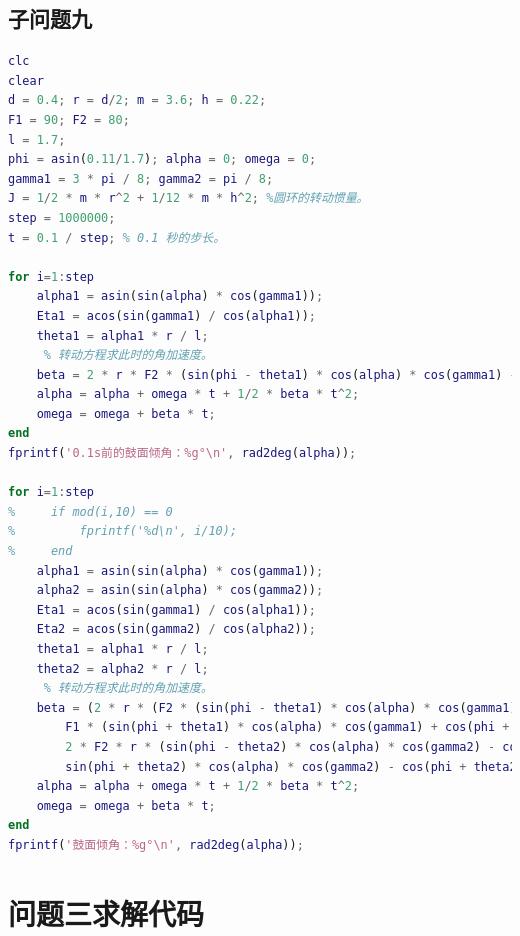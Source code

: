 \documentclass{cumcm}
\begin{document}
\subsection{子问题九}
\begin{lstlisting}[language=matlab]
clc
clear
d = 0.4; r = d/2; m = 3.6; h = 0.22;
F1 = 90; F2 = 80;
l = 1.7;
phi = asin(0.11/1.7); alpha = 0; omega = 0;
gamma1 = 3 * pi / 8; gamma2 = pi / 8;
J = 1/2 * m * r^2 + 1/12 * m * h^2; %圆环的转动惯量。
step = 1000000;
t = 0.1 / step; % 0.1 秒的步长。

for i=1:step
    alpha1 = asin(sin(alpha) * cos(gamma1));
    Eta1 = acos(sin(gamma1) / cos(alpha1));
    theta1 = alpha1 * r / l;
     % 转动方程求此时的角加速度。
    beta = 2 * r * F2 * (sin(phi - theta1) * cos(alpha) * cos(gamma1) - cos(phi - theta1) * sin(alpha1) * sin(Eta1)) / J;
    alpha = alpha + omega * t + 1/2 * beta * t^2;
    omega = omega + beta * t;
end
fprintf('0.1s前的鼓面倾角：%g°\n', rad2deg(alpha));

for i=1:step
%     if mod(i,10) == 0
%         fprintf('%d\n', i/10);
%     end
    alpha1 = asin(sin(alpha) * cos(gamma1));
    alpha2 = asin(sin(alpha) * cos(gamma2));
    Eta1 = acos(sin(gamma1) / cos(alpha1));
    Eta2 = acos(sin(gamma2) / cos(alpha2));
    theta1 = alpha1 * r / l;
    theta2 = alpha2 * r / l;
     % 转动方程求此时的角加速度。
    beta = (2 * r * (F2 * (sin(phi - theta1) * cos(alpha) * cos(gamma1) - cos(phi - theta1) * sin(alpha1) * sin(Eta1)) - ...
        F1 * (sin(phi + theta1) * cos(alpha) * cos(gamma1) + cos(phi + theta1) * sin(alpha1) * sin(Eta1))) + ...
        2 * F2 * r * (sin(phi - theta2) * cos(alpha) * cos(gamma2) - cos(phi - theta2) * sin(alpha2) * sin(Eta2) - ...
        sin(phi + theta2) * cos(alpha) * cos(gamma2) - cos(phi + theta2) * sin(alpha2) * sin(Eta2))) / J;
    alpha = alpha + omega * t + 1/2 * beta * t^2;
    omega = omega + beta * t;
end
fprintf('鼓面倾角：%g°\n', rad2deg(alpha));
\end{lstlisting}

\section{问题三求解代码}
\end{document}
